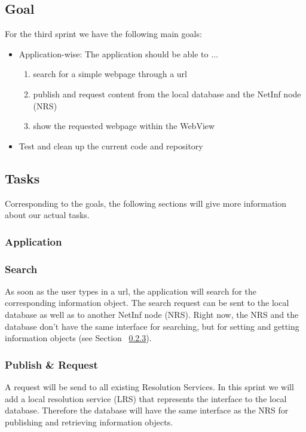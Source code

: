 \documentclass[a4paper,10pt]{article}
\newcommand{\sect}[1]{Section ~\ref{sect:#1}}
\begin{document}
\subsection{Goal}
\label{sect:goal}
For the third sprint we have the following main goals:
\begin{itemize}
 \item Application-wise: The application should be able to $\dots$
 \begin{enumerate}
  \item search for a simple webpage through a url
  \item publish and request content from the local database and the NetInf node (NRS)
  \item show the requested webpage within the WebView
 \end{enumerate}
 \item Test and clean up the current code and repository
\end{itemize}

\subsection{Tasks}
\label{sect:explanation}
Corresponding to the goals, the following sections will give more information
about our actual tasks.

\subsubsection{Application}
\subsubsection{Search}
As soon as the user types in a url, the application will search for the
corresponding information object. The search request can be sent to the local database
as well as to another NetInf node (NRS). Right now, the NRS and the database don't have
the same interface for searching, but for setting and getting information objects (see \sect{request}).

\subsubsection{Publish \& Request}
\label{sect:request}
A request will be send to all existing Resolution Services. In this sprint we will 
add a local resolution service (LRS) that represents the interface to the local database.
Therefore the database will have the same interface as the NRS for publishing and
retrieving information objects.
\end{document}
